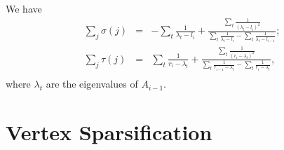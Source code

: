 \documentclass[12pt]{article}
\begin{document}
    We have
    \begin{eqnarray*}
        \sum_j \sigma(j) &=& -\sum_t \frac{1}{\lambda_t - l_i} +
        \frac{\sum_t \frac{1}{(\lambda_t - l_i)^2}}
        {\sum_t \frac{1}{\lambda_t - l_i} - \sum_t \frac{1}{\lambda_t - l_{i-1}}};\\ 
        \sum_j \tau(j) &=& \sum_t \frac{1}{r_i - \lambda_t} +
        \frac{\sum_t \frac{1}{(r_i - \lambda_t)^2}}
        {\sum_t \frac{1}{r_{i-1} - \lambda_t} - \sum_t \frac{1}{r_i - \lambda_t}},\\ 
    \end{eqnarray*}
    where $\lambda_t$ are the eigenvalues of $A_{i-1}$.

    \section{Vertex Sparsification}
    
    
\end{document}
